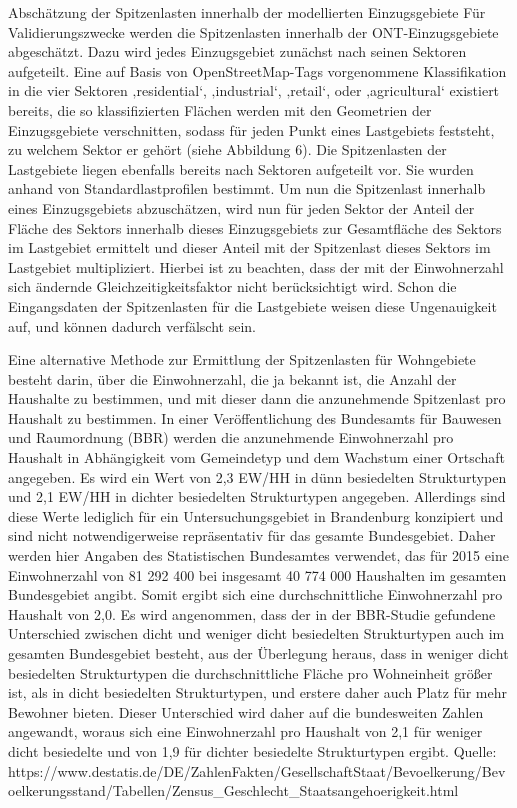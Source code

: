 \documentclass[11pt]{scrreprt}
\begin{document}
Abschätzung der Spitzenlasten innerhalb der modellierten Einzugsgebiete
Für Validierungszwecke werden die Spitzenlasten innerhalb der ONT-Einzugsgebiete abgeschätzt. Dazu wird jedes Einzugsgebiet zunächst nach seinen Sektoren aufgeteilt. Eine auf Basis von OpenStreetMap-Tags vorgenommene Klassifikation in die vier Sektoren ‚residential‘, ‚industrial‘, ‚retail‘, oder ‚agricultural‘ existiert bereits, die so klassifizierten Flächen werden mit den Geometrien der Einzugsgebiete verschnitten, sodass für jeden Punkt eines Lastgebiets feststeht, zu welchem Sektor er gehört (siehe Abbildung 6). Die Spitzenlasten der Lastgebiete liegen ebenfalls bereits nach Sektoren aufgeteilt vor. Sie wurden anhand von Standardlastprofilen bestimmt. Um nun die Spitzenlast innerhalb eines Einzugsgebiets abzuschätzen, wird nun für jeden Sektor der Anteil der Fläche des Sektors innerhalb dieses Einzugsgebiets zur Gesamtfläche des Sektors im Lastgebiet ermittelt und dieser Anteil mit der Spitzenlast dieses Sektors im Lastgebiet multipliziert. Hierbei ist zu beachten, dass der mit der Einwohnerzahl sich ändernde Gleichzeitigkeitsfaktor nicht berücksichtigt wird. Schon die Eingangsdaten der Spitzenlasten für die Lastgebiete weisen diese Ungenauigkeit auf, und können dadurch verfälscht sein.

Eine alternative Methode zur Ermittlung der Spitzenlasten für Wohngebiete besteht darin, über die Einwohnerzahl, die ja bekannt ist, die Anzahl der Haushalte zu bestimmen, und mit dieser dann die anzunehmende Spitzenlast pro Haushalt zu bestimmen. In einer Veröffentlichung des Bundesamts für Bauwesen und Raumordnung (BBR) werden die anzunehmende Einwohnerzahl pro Haushalt in Abhängigkeit vom Gemeindetyp und dem Wachstum einer Ortschaft angegeben. Es wird ein Wert von 2,3 EW/HH in dünn besiedelten Strukturtypen und 2,1 EW/HH in dichter besiedelten Strukturtypen angegeben.
Allerdings sind diese Werte lediglich für ein Untersuchungsgebiet in Brandenburg konzipiert und sind nicht notwendigerweise repräsentativ für das gesamte Bundesgebiet. Daher werden hier Angaben des Statistischen Bundesamtes verwendet, das für 2015 eine Einwohnerzahl von 81 292 400 bei insgesamt 40 774 000 Haushalten im gesamten Bundesgebiet angibt. Somit ergibt sich eine durchschnittliche Einwohnerzahl pro Haushalt von 2,0. Es wird angenommen, dass der in der BBR-Studie  gefundene Unterschied zwischen dicht und weniger dicht besiedelten Strukturtypen auch im gesamten Bundesgebiet besteht, aus der Überlegung heraus, dass in weniger dicht besiedelten Strukturtypen die durchschnittliche Fläche pro Wohneinheit größer ist, als in dicht besiedelten Strukturtypen, und erstere daher auch Platz für mehr Bewohner bieten. Dieser Unterschied wird daher auf die bundesweiten Zahlen angewandt, woraus sich eine Einwohnerzahl pro Haushalt von 2,1 für weniger dicht besiedelte und von 1,9 für dichter besiedelte Strukturtypen ergibt.
Quelle: https://www.destatis.de/DE/ZahlenFakten/GesellschaftStaat/Bevoelkerung/Bevoelkerungsstand/Tabellen/Zensus_Geschlecht_Staatsangehoerigkeit.html 
\end{document}
